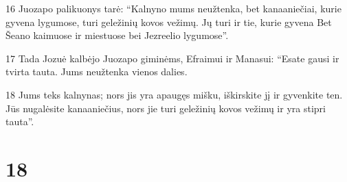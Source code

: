 \par 16 Juozapo palikuonys tarė: “Kalnyno mums neužtenka, bet kanaaniečiai, kurie gyvena lygumose, turi geležinių kovos vežimų. Jų turi ir tie, kurie gyvena Bet Šeano kaimuose ir miestuose bei Jezreelio lygumose”. 
\par 17 Tada Jozuė kalbėjo Juozapo giminėms, Efraimui ir Manasui: “Esate gausi ir tvirta tauta. Jums neužtenka vienos dalies. 
\par 18 Jums teks kalnynas; nors jis yra apaugęs mišku, iškirskite jį ir gyvenkite ten. Jūs nugalėsite kanaaniečius, nors jie turi geležinių kovos vežimų ir yra stipri tauta”.



\chapter{18}

